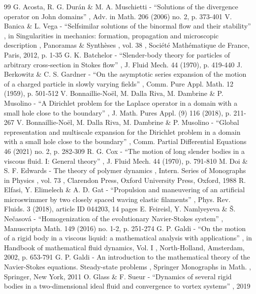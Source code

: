 \documentclass[11pt]{article}
\theoremstyle{definition}
\theoremstyle{remark}
\begin{document}
\begin{thebibliography}{99}
 G. Acosta, R. G. Durán \& M. A. Muschietti - “Solutions of the divergence operator on John domains” , Adv. in Math. 206 (2006) no. 2, p. 373-401
 V. Banica \& L. Vega - “Selfsimilar solutions of the binormal flow and their stability” , in Singularities in mechanics: formation, propagation and microscopic description , Panoramas \& Synthèses , vol. 38 , Société Mathématique de France, Paris, 2012, p. 1-35
 G. K. Batchelor - “Slender-body theory for particles of arbitrary cross-section in Stokes flow” , J. Fluid Mech. 44 (1970), p. 419-440
 J. Berkowitz \& C. S. Gardner - “On the asymptotic series expansion of the motion of a charged particle in slowly varying fields” , Comm. Pure Appl. Math. 12 (1959), p. 501-512
 V. Bonnaillie-Noël, M. Dalla Riva, M. Dambrine \& P. Musolino - “A Dirichlet problem for the Laplace operator in a domain with a small hole close to the boundary” , J. Math. Pures Appl. (9) 116 (2018), p. 211-267
 V. Bonnaillie-Noël, M. Dalla Riva, M. Dambrine \& P. Musolino - “Global representation and multiscale expansion for the Dirichlet problem in a domain with a small hole close to the boundary” , Comm. Partial Differential Equations 46 (2021) no. 2, p. 282-309
 R. G. Cox - “The motion of long slender bodies in a viscous fluid. I: General theory” , J. Fluid Mech. 44 (1970), p. 791-810
 M. Doi \& S. F. Edwards - The theory of polymer dynamics , Intern. Series of Monographs in Physics , vol. 73 , Clarendon Press, Oxford University Press, Oxford, 1988
 R. Elfasi, Y. Elimelech \& A. D. Gat - “Propulsion and maneuvering of an artificial microswimmer by two closely spaced waving elastic filaments” , Phys. Rev. Fluids. 3 (2018), article ID 044203, 14 pages
 E. Feireisl, Y. Namlyeyeva \& Š. Nečasová - “Homogenization of the evolutionary Navier-Stokes system” , Manuscripta Math. 149 (2016) no. 1-2, p. 251-274
 G. P. Galdi - “On the motion of a rigid body in a viscous liquid: a mathematical analysis with applications” , in Handbook of mathematical fluid dynamics, Vol. I , North-Holland, Amsterdam, 2002, p. 653-791
 G. P. Galdi - An introduction to the mathematical theory of the Navier-Stokes equations. Steady-state problems , Springer Monographs in Math. , Springer, New York, 2011
 O. Glass \& F. Sueur - “Dynamics of several rigid bodies in a two-dimensional ideal fluid and convergence to vortex systems” , 2019

\end{thebibliography}
\end{document}
